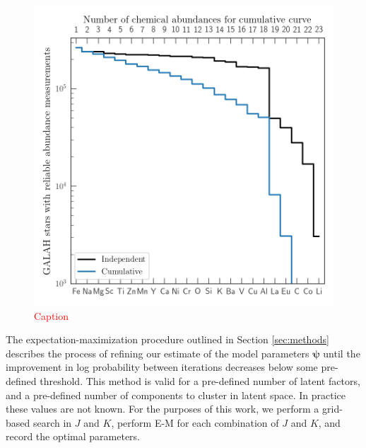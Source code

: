 \documentclass[twocolumn]{aastex61}
\newcommand\teff{T_{\rm eff}}
\newcommand\logg{\log{g}}
\newcommand{\todo}[1]{\textcolor{red}{#1}}
\newcommand{\vect}[1]{\boldsymbol{\mathbf{#1}}}
\renewcommand{\vec}[1]{\vect{#1}}
\begin{document}
\begin{figure}
	\includegraphics[width=1.0\textwidth]{experiments/galah-abundances.png}
    \caption{\todo{Caption}}
    \label{fig:galah-abundances}
\end{figure}

The expectation-maximization procedure outlined in Section \ref{sec:methods} describes 
the process of refining our estimate of the model parameters $\vec\psi$ until
the improvement in log probability between iterations decreases below some
pre-defined threshold. This method is valid for a pre-defined number of latent
factors, and a pre-defined number of components to cluster in latent space.
In practice these values are not known. For the purposes of this work, we 
perform a grid-based search in $J$ and $K$, perform E-M for each combination of
$J$ and $K$, and record the optimal parameters.
\end{document}
